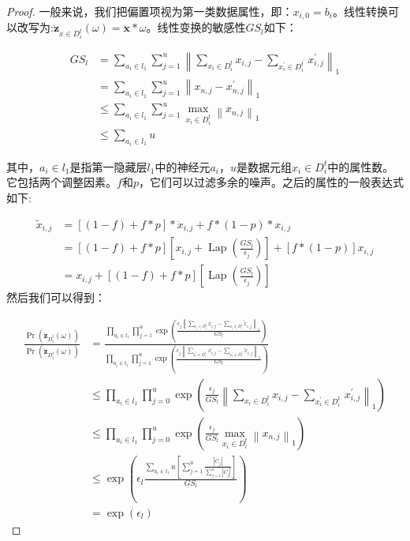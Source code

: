 \begin{proof}
一般来说，我们把偏置项视为第一类数据属性，即：$x_{i, 0}=b_{i}$。线性转换可以改写为:$\ddot{\mathbf{z}}_{x \in D_{i}^{t}}(\omega)=\ddot{\mathbf{x}} * \omega$。线性变换的敏感性$G S_{l}$如下：

$$\begin{aligned} G S_{l} &=\sum_{a_{i} \in l_{1}} \sum_{j=1}^{u}\left\|\sum_{x_{i} \in D_{i}^{t}} x_{i, j}-\sum_{x_{i}^{\prime} \in D_{i}^{t^{\prime}}} x_{i, j}^{\prime}\right\|_{1} \\ &=\sum_{a_{i} \in l_{1}} \sum_{j=1}^{u}\left\|x_{n, j}-x_{n, j}^{\prime}\right\|_{1} \\ & \leq \sum_{a_{i} \in l_{1}} \sum_{j=1}^{u} \max _{x_{i} \in D_{i}^{t}}\left\|x_{n, j}\right\|_{1} \\ & \leq \sum_{a_{i} \in l_{1}} u \end{aligned}$$

其中，$a_{i} \in l_{1}$是指第一隐藏层$l_{1}$中的神经元$a_{i}$，$u$是数据元组$x_{i} \in D_{i}^{t}$中的属性数。它包括两个调整因素。$f$和$p$，它们可以过滤多余的噪声。之后的属性的一般表达式如下:

$$
\begin{aligned}
\tilde{x}_{i, j} &=[(1-f)+f * p] * \ddot{x}_{i, j}+f *(1-p) * x_{i, j} \\
&=[(1-f)+f * p]\left[x_{i, j}+\operatorname{Lap}\left(\frac{G S_{l}}{\epsilon_{j}}\right)\right]+[f *(1-p)] x_{i, j} \\
&=x_{i, j}+[(1-f)+f * p]\left[\operatorname{Lap}\left(\frac{G S_{l}}{\epsilon_{j}}\right)\right]
\end{aligned}
$$
然后我们可以得到：

$$
\begin{aligned}
\frac{\operatorname{Pr}\left(\ddot{\mathbf{z}}_{D_{i}^{t}}(\omega)\right)}{\operatorname{Pr}\left(\ddot{\mathbf{z}}_{D_{i}^{t}}(\omega)\right)} &=\frac{\prod_{a_{i} \in l_{1}} \prod_{j=1}^{u} \exp \left(\frac{\epsilon_{j}\left\|\sum_{x_{i} \in D_{i}^{t}} x_{i, j}-\sum_{x_{i} \in D_{i}^{t}} \tilde{x}_{i, j}\right\|_{1}}{G S_{l}}\right)}{\prod_{a_{i} \in l_{1}} \prod_{j=1}^{u} \exp \left(\frac{\epsilon_{j}\left\|\sum_{x_{i}^{\prime} \in D_{i}^{t^{\prime}}} x_{i, j}^{\prime}-\sum_{x_{i}^{\prime} \in D_{i}^{t^{\prime}}} \tilde{x}_{i, j}^{\prime}\right\|_{1}}{G S_{l}}\right)} \\
& \leq \prod_{a_{i} \in l_{1}} \prod_{j=0}^{u} \exp \left(\frac{\epsilon_{j}}{G S_{l}}\left\|\sum_{x_{i} \in D_{i}^{t}} x_{i, j}-\sum_{x_{i}^{\prime} \in D_{i}^{t^{\prime}}} x_{i, j}^{\prime}\right\|_{1}\right) \\
& \leq \prod_{a_{i} \in l_{1}} \prod_{j=0}^{u} \exp \left(\frac{\epsilon_{j}}{G S_{l}} \max _{x_{i} \in D_{i}^{t}}\left\|x_{n, j}\right\|_{1}\right) \\
& \leq \exp \left(\epsilon_{l} \frac{\sum_{a_{i} \in l_{1}} u\left[\sum_{j=1}^{u} \frac{\left|\ddot{C}_{j}\right|}{\sum_{j=1}^{u}\left|\ddot{C}_{j}\right|}\right]}{G S_{l}}\right) \\
&=\exp \left(\epsilon_{l}\right)
\end{aligned}
$$
\end{proof}

